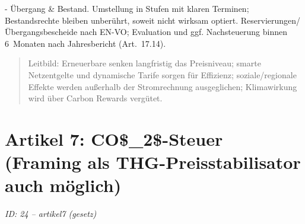 \documentclass[12pt,a4paper]{scrartcl}
\begin{document}
- Übergang \& Bestand. Umstellung in Stufen mit klaren Terminen; Bestandsrechte bleiben unberührt, soweit nicht wirksam optiert. Reservierungen/Übergangsbescheide nach EN-VO; Evaluation und ggf. Nachsteuerung binnen 6 Monaten nach Jahresbericht (Art. 17.14).

{\footnotesize\begin{quote}
Leitbild: Erneuerbare senken langfristig das Preisniveau; smarte Netzentgelte und dynamische Tarife sorgen für Effizienz; soziale/regionale Effekte werden außerhalb der Stromrechnung ausgeglichen; Klimawirkung wird über Carbon Rewards vergütet.
\end{quote}}



\section[Artikel 7: CO\$\_2\$-Steuer (Framing als THG-Preisstabilisator auch möglich)]{Artikel 7: CO\$\_2\$-Steuer (Framing als THG-Preisstabilisator auch möglich)}
\noindent\textit{ID: 24 -- artikel7 (gesetz)}
\end{document}
